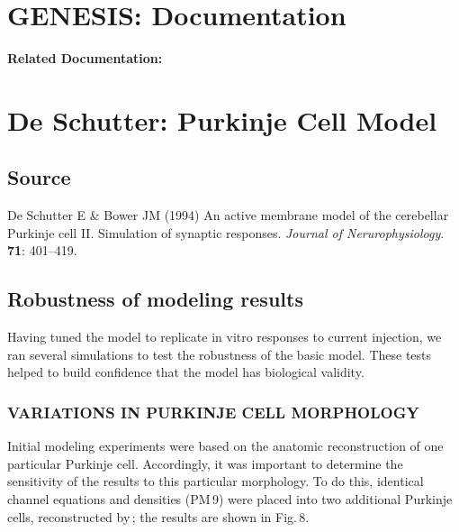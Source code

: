 \documentclass[12pt]{article}
\begin{document}
\section*{GENESIS: Documentation}

{\bf Related Documentation:}

\section*{De Schutter: Purkinje Cell Model}

\subsection*{Source}

De Schutter E \& Bower JM (1994) An active membrane model of the cerebellar Purkinje cell II. Simulation of synaptic responses. {\it Journal of Nerurophysiology}. {\bf 71}: 401--419.

\subsection*{Robustness of modeling results}

Having tuned the model to replicate in vitro responses to current injection, we ran several simulations to test the robustness of the basic model. These tests helped to build confidence that the model has biological validity.

\subsubsection*{VARIATIONS IN PURKINJE CELL MORPHOLOGY}

Initial modeling experiments were based on the anatomic reconstruction of one particular Purkinje cell. Accordingly, it was important to determine the sensitivity of the results to this particular morphology. To do this, identical channel equations and densities (PM\,9) were placed into two additional Purkinje cells, reconstructed
by\,\cite{Rapp-P:1994qf}; the results are shown in Fig.\,8.
\end{document}
